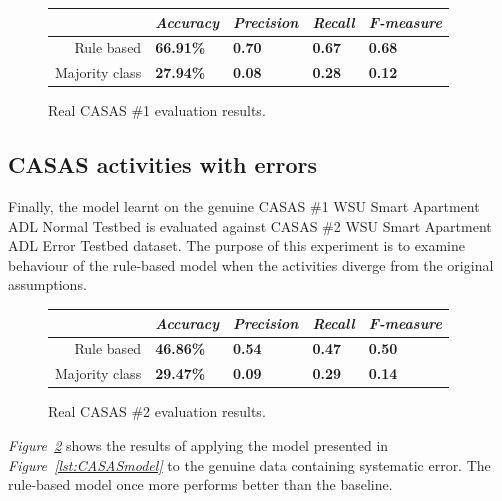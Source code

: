 \documentclass[10pt, a4paper, pdflatex, leqno, twoside, openright]{report}
\begin{document}
\begin{figure}[htb]
  \centering
  \begin{tabular}{ r | l l l l }
  & \emph{Accuracy} & \emph{Precision} & \emph{Recall} & \emph{F-measure}\\
\hline
Rule based & \textbf{66.91\%} & \textbf{0.70} & \textbf{0.67} & \textbf{0.68}\\
Majority class & \textbf{27.94\%} & \textbf{0.08} & \textbf{0.28} & \textbf{0.12}\\
  \end{tabular}
  \caption{Real CASAS \#1 evaluation results.\label{tab:realCASASstats}} %
\end{figure}

    \subsection{CASAS activities with errors}
Finally, the model learnt on the genuine CASAS \#1 WSU Smart Apartment ADL Normal Testbed is evaluated against CASAS \#2 WSU Smart Apartment ADL Error Testbed dataset. The purpose of this experiment is to examine behaviour of the rule-based model when the activities diverge from the original assumptions.\\

\begin{figure}[htb]
  \centering
  \begin{tabular}{ r | l l l l }
  & \emph{Accuracy} & \emph{Precision} & \emph{Recall} & \emph{F-measure}\\
\hline
Rule based & \textbf{46.86\%} & \textbf{0.54} & \textbf{0.47} & \textbf{0.50}\\
Majority class & \textbf{29.47\%} & \textbf{0.09} & \textbf{0.29} & \textbf{0.14}\\
  \end{tabular}
  \caption{Real CASAS \#2 evaluation results.\label{tab:errCASASstats}} %
\end{figure}

\emph{Figure~\ref{tab:errCASASstats}} shows the results of applying the model presented in \emph{Figure~\ref{lst:CASASmodel}} to the genuine data containing systematic error. The rule-based model once more performs better than the baseline.
\end{document}
